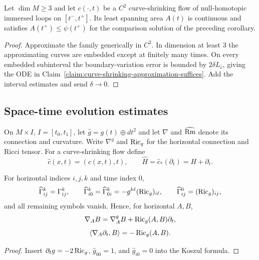 \begin{lemma}
\label{lem:immersed-curve-shrinking-area-bound}
\label{nonembeasycase}
Let $\dim M\ge3$ and let $c(\cdot,t)$ be a $C^2$ curve-shrinking flow of
null-homotopic immersed loops on $[t^-,t^+]$. Its least spanning area $A(t)$
is continuous and satisfies $A(t^+)\le\psi(t^+)$ for the comparison solution
of the preceding corollary.
\end{lemma}
\begin{proof}
\sketch Approximate the family generically in $C^2$. In dimension at least $3$ the
approximating curves are embedded except at finitely many times. On every
embedded subinterval the boundary-variation error is bounded by
$2\delta L_{\hat c}$, giving the ODE in
Claim~\ref{claim:curve-shrinking-approximation-suffices}. Add the interval
estimates and send $\delta\to0$.
\end{proof}

\subsection{Space-time evolution estimates}

\begin{notation}
\label{not:curve-shrinking-spacetime}
\label{spacetimehat}
On $M\times I$, $I=[t_0,t_1]$, let $\hat g=g(t)\oplus dt^2$ and let $\nabla$
and $\widehat{\operatorname{Rm}}$ denote its connection and curvature. Write $\nabla^g$ and
$\operatorname{Ric}_g$ for the horizontal connection and Ricci tensor. For a
curve-shrinking flow define
\[
\hat c(x,t)=(c(x,t),t),\qquad \widehat H=\hat c_*(\partial_t)=H+\partial_t.
\]
\end{notation}

\begin{lemma}
\label{lem:spacetime-christoffel}
\label{hatchristoffel}

For horizontal indices $i,j,k$ and time index $0$,
\[
\widehat\Gamma^k_{ij}=\Gamma^k_{ij},\qquad
\widehat\Gamma^k_{i0}=\widehat\Gamma^k_{0i}=-g^{k\ell}(\operatorname{Ric}_g)_{i\ell},
\qquad \widehat\Gamma^0_{ij}=(\operatorname{Ric}_g)_{ij},
\]
and all remaining symbols vanish. Hence, for horizontal $A,B$,
\begin{equation}\label{hatEq1}
\nabla_AB=\nabla^g_AB+\operatorname{Ric}_g(A,B)\partial_t,
\end{equation}
\begin{equation}\label{hatEq2}
\langle\nabla_A\partial_t,B\rangle=-\operatorname{Ric}_g(A,B).
\end{equation}
\end{lemma}
\begin{proof}
\sketch Insert $\partial_tg=-2\operatorname{Ric}_g$, $\hat g_{00}=1$, and $\hat g_{i0}=0$ into the
Koszul formula.
\end{proof}

